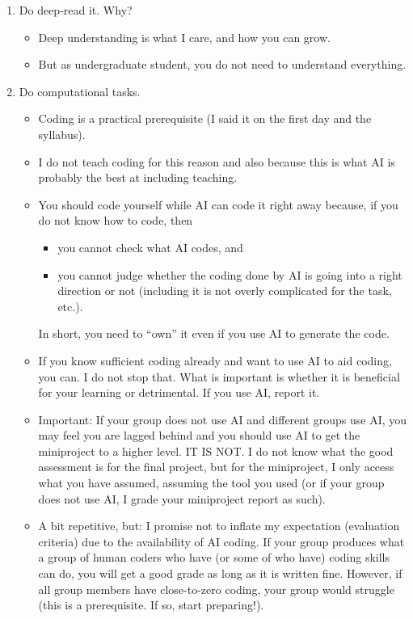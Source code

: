 \documentclass[20pt]{extarticle}
\begin{document}
\begin{enumerate}
\begin{itemize}
	\end{itemize}
\item Do deep-read it. Why?
	\begin{itemize}
	\item Deep understanding is what I care, and how you can grow.
	\item But as undergraduate student, you do not need to understand everything.
	\end{itemize}
\item Do computational tasks.
	\begin{itemize}
	\item Coding is a practical prerequisite (I said it on the first day and the syllabus).
	\item I do not teach coding for this reason and also because this is what AI is probably the best at including teaching.
	\item You should code yourself while AI can code it right away because, if you do not know how to code, then
		\begin{itemize}
		\item you cannot check what AI codes, and
		\item you cannot judge whether the coding done by AI is going into a right direction or not (including it is not overly complicated for the task, etc.).
		\end{itemize}
		In short, you need to ``own'' it even if you use AI to generate the code.
	\item If you know sufficient coding already and want to use AI to aid coding, you can. I do not stop that. What is important is whether it is beneficial for your learning or detrimental. If you use AI, report it.
	\item Important: If your group does not use AI and different groups use AI, you may feel you are lagged behind and you should use AI to get the miniproject to a higher level. IT IS NOT. I do not know what the good assessment is for the final project, but for the miniproject, I only access what you have assumed, assuming the tool you used (or if your group does not use AI, I grade your miniproject report as such).
	\item A bit repetitive, but: I promise not to inflate my expectation (evaluation criteria) due to the availability of AI coding. If your group produces what a group of human coders who have (or some of who have) coding skills can do, you will get a good grade as long as it is written fine. However, if all group members have close-to-zero coding, your group would struggle (this is a prerequisite. If so, start preparing!).

\end{itemize}
\end{enumerate}
\end{document}
